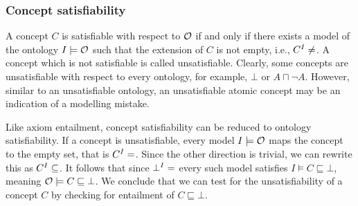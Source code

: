 \subsubsection{Concept satisfiability} \label{concept-satisfiability}

A concept $C$ is satisfiable with respect to $\mathcal{O}$ if and only if there exists a model of the ontology $I \models \mathcal{O}$ such that the extension of $C$ is not empty, i.e., $C^I \not= \empty$. A concept which is not satisfiable is called unsatisfiable. Clearly, some concepts are unsatisfiable with respect to every ontology, for example, $\bot$ or $A \sqcap \lnot A$. However, similar to an unsatisfiable ontology, an unsatisfiable atomic concept may be an indication of a modelling mistake.

Like axiom entailment, concept satisfiability can be reduced to ontology satisfiability. If a concept is unsatisfiable, every model $I \models \mathcal{O}$ maps the concept to the empty set, that is $C^I = \empty$. Since the other direction is trivial, we can rewrite this as $C^I \subseteq \empty$. It follows that since $\bot^I = \empty$ every such model satisfies $I \models C \sqsubseteq \bot$, meaning $\mathcal{O} \models C \sqsubseteq \bot$. We conclude that we can test for the unsatisfiability of a concept $C$ by checking for entailment of $C \sqsubseteq \bot$.
